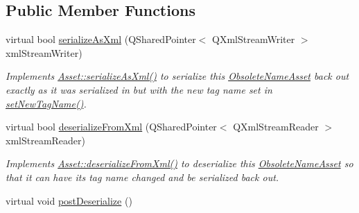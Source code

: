 \subsection*{Public Member Functions}
\begin{DoxyCompactItemize}
\item 
\hypertarget{class_picto_1_1_obsolete_name_asset_abded9d73a89f4d428ea8f2209db52116}{virtual bool \hyperlink{class_picto_1_1_obsolete_name_asset_abded9d73a89f4d428ea8f2209db52116}{serialize\-As\-Xml} (Q\-Shared\-Pointer$<$ Q\-Xml\-Stream\-Writer $>$ xml\-Stream\-Writer)}\label{class_picto_1_1_obsolete_name_asset_abded9d73a89f4d428ea8f2209db52116}

\begin{DoxyCompactList}\small\item\em Implements \hyperlink{class_picto_1_1_asset_a3ecc27a886c700438d98187e030d203f}{Asset\-::serialize\-As\-Xml()} to serialize this \hyperlink{class_picto_1_1_obsolete_name_asset}{Obsolete\-Name\-Asset} back out exactly as it was serialized in but with the new tag name set in \hyperlink{class_picto_1_1_obsolete_name_asset_aca62d0a7a2e27330ed5c3b406c4a8301}{set\-New\-Tag\-Name()}. \end{DoxyCompactList}\item 
\hypertarget{class_picto_1_1_obsolete_name_asset_a4b599e076cac6ff2004ac637c54f9a17}{virtual bool \hyperlink{class_picto_1_1_obsolete_name_asset_a4b599e076cac6ff2004ac637c54f9a17}{deserialize\-From\-Xml} (Q\-Shared\-Pointer$<$ Q\-Xml\-Stream\-Reader $>$ xml\-Stream\-Reader)}\label{class_picto_1_1_obsolete_name_asset_a4b599e076cac6ff2004ac637c54f9a17}

\begin{DoxyCompactList}\small\item\em Implements \hyperlink{class_picto_1_1_asset_a45e33e9da0d81734ec9e50a02ac325be}{Asset\-::deserialize\-From\-Xml()} to deserialize this \hyperlink{class_picto_1_1_obsolete_name_asset}{Obsolete\-Name\-Asset} so that it can have its tag name changed and be serialized back out. \end{DoxyCompactList}\item 
\hypertarget{class_picto_1_1_obsolete_name_asset_adea0d9fe85cf6530f7b605c241af087a}{virtual void \hyperlink{class_picto_1_1_obsolete_name_asset_adea0d9fe85cf6530f7b605c241af087a}{post\-Deserialize} ()}\label{class_picto_1_1_obsolete_name_asset_adea0d9fe85cf6530f7b605c241af087a}


\end{DoxyCompactItemize}
